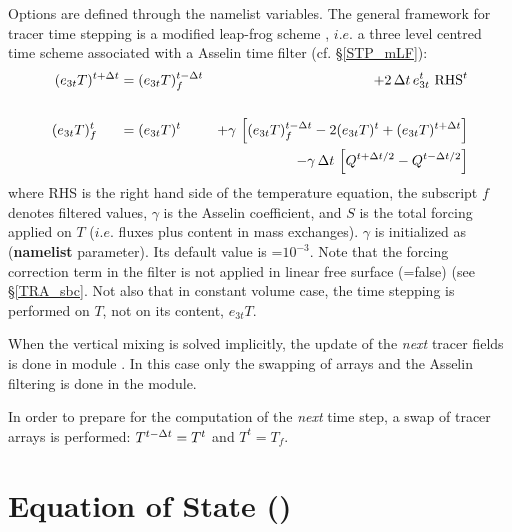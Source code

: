 \documentclass[NEMO_book]{subfiles}
\begin{document}
Options are defined through the   namelist variables.
The general framework for tracer time stepping is a modified leap-frog scheme 
\citep{Leclair_Madec_OM09}, $i.e.$ a three level centred time scheme associated 
with a Asselin time filter (cf. \S\ref{STP_mLF}):
\begin{equation} \label{Eq_tra_nxt}
\begin{aligned}
(e_{3t}T)^{t+\Delta t} &= (e_{3t}T)_f^{t-\Delta t} &+ 2 \, \Delta t  \,e_{3t}^t\ \text{RHS}^t &	\\
\\
(e_{3t}T)_f^t  \;\ \quad &= (e_{3t}T)^t \;\quad 
                                    &+\gamma \,\left[ {(e_{3t}T)_f^{t-\Delta t} -2(e_{3t}T)^t+(e_{3t}T)^{t+\Delta t}} \right] &  \\
                                 & &- \gamma\,\Delta t \, \left[ Q^{t+\Delta t/2} -  Q^{t-\Delta t/2} \right]  &                      
\end{aligned}
\end{equation} 
where RHS is the right hand side of the temperature equation, 
the subscript $f$ denotes filtered values, $\gamma$ is the Asselin coefficient,
and $S$ is the total forcing applied on $T$ ($i.e.$ fluxes plus content in mass exchanges). 
$\gamma$ is initialized as  (\textbf{namelist} parameter). 
Its default value is =$10^{-3}$. Note that the forcing correction term in the filter
is not applied in linear free surface (=false) (see \S\ref{TRA_sbc}.
Not also that in constant volume case, the time stepping is performed on $T$, 
not on its content, $e_{3t}T$.

When the vertical mixing is solved implicitly, the update of the \textit{next} tracer 
fields is done in module . In this case only the swapping of arrays 
and the Asselin filtering is done in the  module.

In order to prepare for the computation of the \textit{next} time step, 
a swap of tracer arrays is performed: $T^{t-\Delta t} = T^t$ and $T^t = T_f$. 

\section  [Equation of State (\textit{eosbn2}) ]
		{Equation of State () }
\label{TRA_eosbn2}
\end{document}
